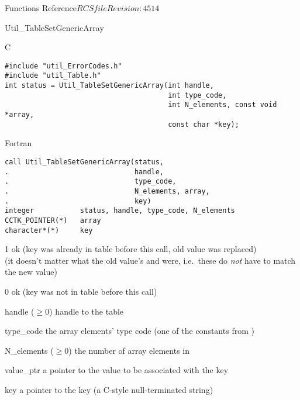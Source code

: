 \begin{cactuspart}{ Functions Reference}{$RCSfile$}{$Revision: 4514 $}
\begin{FunctionDescription}{Util\_TableSetGenericArray}
\begin{SynopsisSection}
\begin{Synopsis}{C}
\begin{verbatim}
#include "util_ErrorCodes.h"
#include "util_Table.h"
int status = Util_TableSetGenericArray(int handle,
                                       int type_code,
                                       int N_elements, const void *array,
                                       const char *key);
\end{verbatim}
\end{Synopsis}
\begin{Synopsis}{Fortran}
\begin{verbatim}
call Util_TableSetGenericArray(status,
.                              handle,
.                              type_code,
.                              N_elements, array,
.                              key)
integer           status, handle, type_code, N_elements
CCTK_POINTER(*)   array
character*(*)     key
\end{verbatim}
\end{Synopsis}
\end{SynopsisSection}

\begin{ResultSection}
\begin{Result}{\rm 1}
ok (key was already in table before this call, old value was replaced)\\
   (it doesn't matter what the old value's  and
     were, i.e.\ these do {\em not\/} have to match
    the new value)
\end{Result}
\begin{Result}{\rm 0}
ok (key was not in table before this call)
\end{Result}
\end{ResultSection}

\begin{ParameterSection}
\begin{Parameter}{handle ($\ge 0$)}
handle to the table
\end{Parameter}
\begin{Parameter}{type\_code}
the array elements' type code
(one of the  constants from )
\end{Parameter}
\begin{Parameter}{N\_elements ($\ge 0$)}
the number of array elements in 
\end{Parameter}
\begin{Parameter}{value\_ptr}
a pointer to the value to be associated with the key
\end{Parameter}
\begin{Parameter}{key}
a pointer to the key (a C-style null-terminated string)
\end{Parameter}
\end{ParameterSection}


\end{FunctionDescription}
\end{cactuspart}
